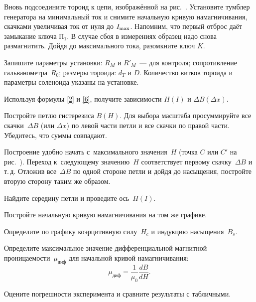 \begin{lab:task}
	\item Вновь подсоедините тороид к цепи, изображённой на рис.~. Установите тумблер генератора на минимальный ток и
снимите  начальную кривую намагничивания,  скачками увеличивая ток от нуля до
$I_{\rm max}$. Напомним, что первый отброс даёт замыкание ключа $\text{П}_1$.  В
случае сбоя в измерениях образец надо снова размагнитить.
	Дойдя до максимального тока,  разомкните ключ $K$.

	\item Запишите параметры установки: $R_M$ и $R'_M$~--- для контроля;
сопротивление гальванометра~$R_0$; размеры тороида:
	$d_T$ и $D$. Количество витков тороида и параметры соленоида указаны на
установке.


		\item Используя формулы \eqref{2} и \eqref{6}, получите зависимости
        $H(I)$ и $\Delta B(\Delta x)$.

		\item Постройте петлю гистерезиса $B(H)$. Для выбора масштаба
просуммируйте все скачки~$\Delta B$ (или $\Delta x$) по левой части
		петли и все скачки по правой части. Убедитесь, что суммы совпадают.

		Построение удобно начать с~максимального значения~$H$ (точка $C$ или
$C'$ на рис.~). Переход к~следующему
значению~$H$ соответствует первому скачку~$\Delta B$ и т.\,д.
Отложив все~$\Delta B$ по одной стороне петли и дойдя до насыщения, постройте
вторую сторону таким же образом.

		Найдите середину петли и проведите ось~$H(I)$.

		\item Постройте начальную кривую намагничивания на том же графике.

		\item Определите по графику коэрцитивную силу~$H_c$ и индукцию
насыщения~$B_s$.

		\item Определите максимальное значение дифференциальной магнитной
проницаемости~$\mu_\text{диф}$ для начальной кривой
		намагничивания:
		\begin{equation*}
			\mu_\text{диф}=\frac{1}{\mu_0}\frac{dB}{dH}.
		\end{equation*}

		\item Оцените погрешности эксперимента и сравните
        результаты с табличными.


\end{lab:task}


